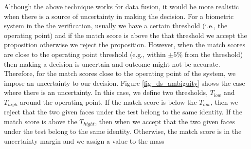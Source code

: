 Although the above technique works for data fusion, it would be more
realistic when there is a source of uncertainty in making the
decision. For a biometric system in the the verification, usually we
have a certain threshold (i.e., the operating point) and if the
match score is above the that threshold we accept the proposition
otherwise we reject the proposition. However, when the match scores
are close to the operating point threshold (e.g., within $\pm5\%$
from the threshold) then making a decision is uncertain and outcome
might not be accurate. Therefore, for the match scores close to the
operating point of the system, we impose an uncertainty to our
decision. Figure \ref{fig_ds_ambiguity} shows the case where there
is an uncertainty. In this case, we define two thresholds, $T_{low}$
and $T_{high}$ around the operating point. If the match score is
below the $T_{low}$, then we reject that the two given faces under
the test belong to the same identity. If the match score is above
the $T_{hight}$, then when we accept that the two given faces under
the test belong to the same identity. Otherwise, the match score is
in the uncertainty margin and we assign a value to the mass
